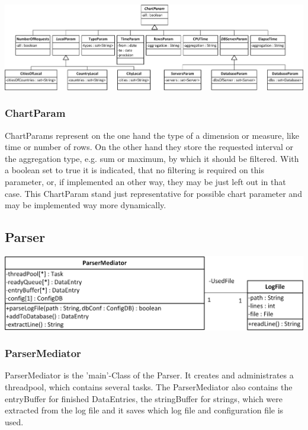 \begin{center}
\includegraphics[width=1\linewidth]{Pictures/Parts/ChartPara.png}
\end{center}  

\subsubsection*{ChartParam}  
ChartParams represent on the one hand the type of a dimension or measure, like time or number of rows.
On the other hand they store the requested interval or the aggregation type, e.g. sum or maximum, by which it should be filtered.
With a boolean set to true it is indicated, that no filtering is required on this parameter, or, if implemented
an other way, they may be just left out in that case.
This ChartParam stand just representative for possible chart parameter and may be implemented way more dynamically.



\newpage
\subsection{Parser}

\begin{center}
\includegraphics{Pictures/Parts/ParsMedi.png}
\end{center}  

\subsubsection*{ParserMediator}
ParserMediator is the 'main'-Class of the Parser. It creates and administrates a threadpool,
 which contains several tasks.
The ParserMediator also contains the entryBuffer for finished DataEntries, the stringBuffer for strings,
which were extracted from the log file and it saves which log file and configuration file is used.

